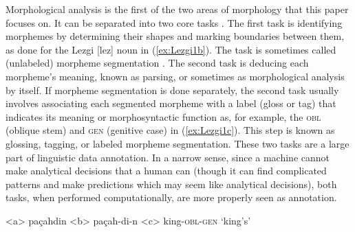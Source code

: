 \documentclass[12pt]{article}
\begin{document}
Morphological analysis is the first of the two areas of morphology that this paper focuses on. It can be separated into two core tasks \cite{cotterell_labeled_2015,hammarstrom_unsupervised_2011,nicolai_morphological_2017,palmer_semi-automated_2009}. The first task is identifying morphemes by determining their shapes and marking boundaries between them, as done for the Lezgi [lez] noun in (\ref{ex:Lezgi1b}). The task is sometimes called (unlabeled) morpheme segmentation \cite{creutz_unsupervised_2007,snyder_unsupervised_2008}. The second task is deducing each morpheme's meaning, known as parsing, or sometimes as morphological analysis by itself. If morpheme segmentation is done separately, the second task usually involves associating each segmented morpheme with a label (gloss or tag) that indicates its meaning or morphosyntactic function as, for example, the \textsc{obl} (oblique stem) and \textsc{gen} (genitive case) in (\ref{ex:Lezgi1c}). This step is known as glossing, tagging, or labeled morpheme segmentation. These two tasks are a large part of linguistic data annotation. In a narrow sense, since a machine cannot make analytical decisions that a human can (though it can find complicated patterns and make predictions which may seem like analytical decisions), both tasks, when performed computationally, are more properly seen as annotation. 

\begin{singlespace}

\label{ex:Lezgi1}
\a<a> pa\c{c}ahdin 
\label{ex:Lezgi1a}
\a<b> pa\c{c}ah-di-n 
\label{ex:Lezgi1b}
\a<c> king-\textsc{obl}-\textsc{gen} 
\label{ex:Lezgi1c}
\a `king's'
\label{ex:Lezgi1d}
\xe

\end{singlespace}
\end{document}
